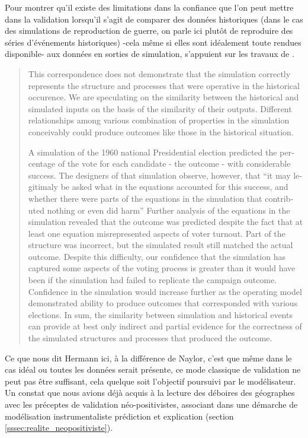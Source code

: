 Pour montrer qu'il existe des limitations dans la confiance que l'on peut mettre dans la validation lorsqu'il s'agit de comparer des données historiques (dans le cas des simulations de reproduction de guerre, on parle ici plutôt de reproduire des séries d'événements historiques) -cela même si elles sont idéalement toute rendues disponible- aux données en sorties de simulation, \textcite{Hermann1967b} s'appuient sur les travaux de \textcite{Pool1965}.

\foreignblockquote{english}[\cite{Pool1965}]{This correspondence does not demonstrate that the simulation correctly represents the structure and processes that were operative in the historical occurence. We are speculating on the similarity between the historical and simulated inputs on the basis of the similarity of their outputs. Different relationships among various combination of properties in the simulation conceivably could produce outcomes like those in the historical situation.

A simulation of the 1960 national Presidential election predicted the percentage of the vote for each candidate - the outcome - with considerable success. The designers of that simulation observe, however, that \enquote{it may legitimaly be asked what in the equations accounted for this success, and whether there were parts of the equations in the simulation that contributed nothing or even did harm} Further analysis of the equations in the simulation revealed that the outcome was predicted despite the fact that at least one equation misrepresented aspects of voter turnout. Part of the structure was incorrect, but the simulated result still matched the actual outcome. Despite this difficulty, our confidence that the simulation has captured some aspects of the voting process is greater than it would have been if the simulation had failed to replicate the campaign outcome. Confidence in the simulation would increase further as the operating model demonstrated ability to produce outcomes that corresponded with various elections. In sum, the similarity between simulation and historical events can provide at best only indirect and partial evidence for the correctness of the simulated structures and processes that produced the outcome.}

Ce que nous dit Hermann ici, à la différence de Naylor, c'est que même dans le cas idéal ou toutes les données serait présente, ce mode classique de validation ne peut pas être suffisant, cela quelque soit l'objectif poursuivi par le modélisateur. Un constat que nous avions déjà acquis à la lecture des déboires des géographes avec les préceptes de validation néo-positivistes, associant dans une démarche de modélisation instrumentaliste prédiction et explication (section \ref{sssec:realite_neopositiviste}).

